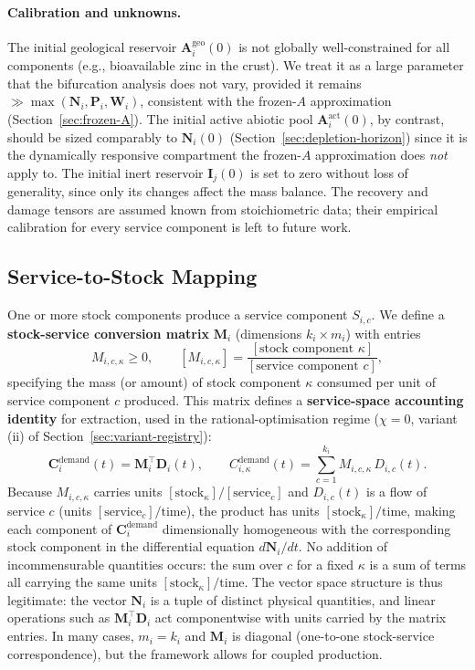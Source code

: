 \documentclass[twocolumn,10pt]{article}
\begin{document}
\paragraph{Calibration and unknowns.}
The initial geological reservoir $\mathbf{A}^{\text{geo}}_i(0)$ is not globally well-constrained for all components (e.g., bioavailable zinc in the crust). We treat it as a large parameter that the bifurcation analysis does not vary, provided it remains $\gg \max(\mathbf{N}_i,\mathbf{P}_i,\mathbf{W}_i)$, consistent with the frozen-$A$ approximation (Section~\ref{sec:frozen-A}). The initial active abiotic pool $\mathbf A^{\text{act}}_i(0)$, by contrast, should be sized comparably to $\mathbf N_i(0)$ (Section~\ref{sec:depletion-horizon}) since it is the dynamically responsive compartment the frozen-$A$ approximation does \emph{not} apply to. The initial inert reservoir $\mathbf{I}_j(0)$ is set to zero without loss of generality, since only its changes affect the mass balance. The recovery and damage tensors are assumed known from stoichiometric data; their empirical calibration for every service component is left to future work.

\subsection{Service-to-Stock Mapping}
\label{sec:service-to-stock}
One or more stock components produce a service component \(S_{i,c}\). We define a \textbf{stock-service
conversion matrix} \(\mathbf{M}_i\) (dimensions \(k_i \times m_i\)) with entries
\[
M_{i,c,\kappa} \ge 0, \qquad [M_{i,c,\kappa}] = \frac{[\text{stock component } \kappa]}{[\text{service component } c]},
\]
specifying the mass (or amount) of stock component \(\kappa\) consumed per unit of service component \(c\) produced. This matrix defines a \textbf{service-space accounting identity} for extraction, used in the rational-optimisation regime ($\chi=0$, variant (ii) of Section~\ref{sec:variant-registry}):
\[
\mathbf{C}_i^{\text{demand}}(t) = \mathbf{M}_i^\top \mathbf{D}_i(t), \qquad
C_{i,\kappa}^{\text{demand}}(t) = \sum_{c=1}^{k_i} M_{i,c,\kappa} \, D_{i,c}(t).
\]
Because \(M_{i,c,\kappa}\) carries units \([\text{stock}_\kappa]/[\text{service}_c]\) and \(D_{i,c}(t)\) is a flow of service \(c\) (units \([\text{service}_c]/\text{time}\)), the product has units \([\text{stock}_\kappa]/\text{time}\), making each component of \(\mathbf{C}_i^{\text{demand}}\) dimensionally homogeneous with the corresponding stock component in the differential equation \(d\mathbf{N}_i/dt\). No addition of incommensurable quantities occurs: the sum over \(c\) for a fixed \(\kappa\) is a sum of terms all carrying the same units \([\text{stock}_\kappa]/\text{time}\). The vector space structure is thus legitimate: the vector \(\mathbf{N}_i\) is a tuple of distinct physical quantities, and linear operations such as \(\mathbf{M}_i^\top \mathbf{D}_i\) act componentwise with units carried by the matrix entries. In many cases, \(m_i = k_i\) and \(\mathbf{M}_i\) is diagonal (one-to-one stock-service correspondence), but the framework allows for coupled production.
\end{document}

